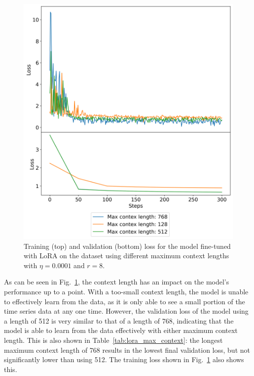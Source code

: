 \documentclass[11pt,a4paper]{article}
\begin{document}
\begin{figure}
    \centering
    \includegraphics[width=\columnwidth, keepaspectratio]{../plots/lora_ctx_loss.png}
    \caption{Training (top) and validation (bottom) loss for the model fine-tuned with LoRA on the dataset using different maximum context lengths with $\eta=0.0001$ and $r=8$.}
    \label{fig:lora_max_context_loss}
\end{figure}

As can be seen in Fig.~\ref{fig:lora_max_context_loss}, the context length has an impact on the model's performance up to a point. With a too-small context length, the model is unable to effectively learn from the data, as it is only able to see a small portion of the time series data at any one time. However, the validation loss of the model using a length of 512 is very similar to that of a length of 768, indicating that the model is able to learn from the data effectively with either maximum context length. This is also shown in Table~\ref{tab:lora_max_context}: the longest maximum context length of 768 results in the lowest final validation loss, but not significantly lower than using 512. The training loss shown in Fig.~\ref{fig:lora_max_context_loss} also shows this.
\end{document}
